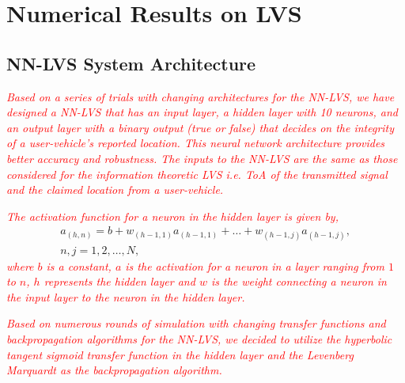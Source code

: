 \documentclass[journal]{IEEEtran}
\begin{document}
\section{Numerical Results on LVS}\label{numerical_results_1}

\subsection{NN-LVS System Architecture}
\indent \textcolor{red}{\textit{Based on a series of trials with changing architectures for the NN-LVS, we have designed a NN-LVS that has an input layer, a hidden layer with 10 neurons, and an output layer with a binary output (true or false) that decides on the integrity of a user-vehicle's reported location. This neural network architecture provides better accuracy and robustness. The inputs to the NN-LVS are the same as those considered for the information theoretic LVS i.e. ToA of the transmitted signal and the claimed location from a user-vehicle.}}

\textcolor{red}{\textit{The activation function for a neuron in the hidden layer is given by,}}
\begin{eqnarray*}\label{NN_equation_1}
    a_{(h,n)}= b + w_{(h-1,1)}a_{(h-1,1)}+\dots+w_{(h-1,j)}a_{(h-1,j)},\\
    n,j=1,2,\dots ,N,\
\end{eqnarray*}
\textcolor{red}{\textit{where $b$ is a constant, $a$ is the activation for a neuron in a layer ranging from $1$ to $n$, $h$ represents the hidden layer and $w$ is the weight connecting a neuron in the input layer to the neuron in the hidden layer.}}

\textcolor{red}{\textit{Based on numerous rounds of simulation with changing transfer functions and backpropagation algorithms for the NN-LVS, we decided to utilize the hyperbolic tangent sigmoid transfer function in the hidden layer and the Levenberg Marquardt as the backpropagation algorithm.}}
\end{document}
